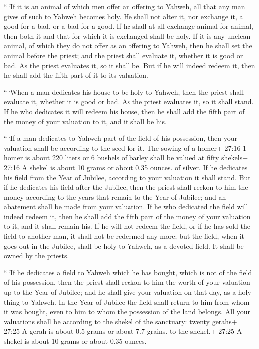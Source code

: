  ``\,`If it is an animal of which men offer an offering to
Yahweh, all that any man gives of such to Yahweh becomes holy.
 He shall not alter it, nor exchange it, a good for a bad,
or a bad for a good. If he shall at all exchange animal for animal, then
both it and that for which it is exchanged shall be holy. 
If it is any unclean animal, of which they do not offer as an offering
to Yahweh, then he shall set the animal before the priest; 
and the priest shall evaluate it, whether it is good or bad. As the
priest evaluates it, so it shall be.  But if he will indeed
redeem it, then he shall add the fifth part of it to its valuation.

 ``\,`When a man dedicates his house to be holy to Yahweh,
then the priest shall evaluate it, whether it is good or bad. As the
priest evaluates it, so it shall stand.  If he who
dedicates it will redeem his house, then he shall add the fifth part of
the money of your valuation to it, and it shall be his.

 ``\,`If a man dedicates to Yahweh part of the field of his
possession, then your valuation shall be according to the seed for it.
The sowing of a homer+ 27:16 1 homer is about 220 liters or 6 bushels of
barley shall be valued at fifty shekels+ 27:16 A shekel is about 10
grams or about 0.35 ounces. of silver.  If he dedicates his
field from the Year of Jubilee, according to your valuation it shall
stand.  But if he dedicates his field after the Jubilee,
then the priest shall reckon to him the money according to the years
that remain to the Year of Jubilee; and an abatement shall be made from
your valuation.  If he who dedicated the field will indeed
redeem it, then he shall add the fifth part of the money of your
valuation to it, and it shall remain his.  If he will not
redeem the field, or if he has sold the field to another man, it shall
not be redeemed any more;  but the field, when it goes out
in the Jubilee, shall be holy to Yahweh, as a devoted field. It shall be
owned by the priests.

 ``\,`If he dedicates a field to Yahweh which he has
bought, which is not of the field of his possession,  then
the priest shall reckon to him the worth of your valuation up to the
Year of Jubilee; and he shall give your valuation on that day, as a holy
thing to Yahweh.  In the Year of Jubilee the field shall
return to him from whom it was bought, even to him to whom the
possession of the land belongs.  All your valuations shall
be according to the shekel of the sanctuary: twenty gerahs+ 27:25 A
gerah is about 0.5 grams or about 7.7 grains. to the shekel.+ 27:25 A
shekel is about 10 grams or about 0.35 ounces.

